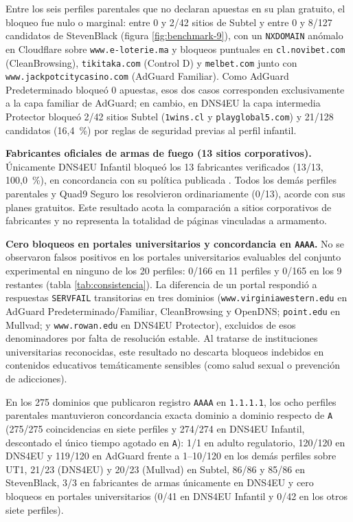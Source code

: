 \documentclass[10pt,a4paper]{article}
\begin{document}
Entre los seis perfiles parentales que no declaran apuestas en su plan gratuito, el bloqueo fue nulo o marginal: entre 0 y 2/42 sitios de Subtel y entre 0 y 8/127 candidatos de StevenBlack (figura \ref{fig:benchmark-9}), con un \texttt{NXDOMAIN} anómalo en Cloudflare sobre \texttt{www.e-loterie.ma} y bloqueos puntuales en \texttt{cl.novibet.com} (CleanBrowsing), \texttt{tikitaka.com} (Control D) y \texttt{melbet.com} junto con \texttt{www.jackpotcitycasino.com} (AdGuard Familiar). Como AdGuard Predeterminado bloqueó 0 apuestas, esos dos casos corresponden exclusivamente a la capa familiar de AdGuard; en cambio, en DNS4EU la capa intermedia Protector bloqueó 2/42 sitios Subtel (\texttt{1wins.cl} y \texttt{playglobal5.com}) y 21/128 candidatos (16,4~\%) por reglas de seguridad previas al perfil infantil.

\textbf{Fabricantes oficiales de armas de fuego (13 sitios corporativos).} Únicamente DNS4EU Infantil bloqueó los 13 fabricantes verificados (13/13, 100,0~\%), en concordancia con su política publicada \cite{dns4eupolitica}. Todos los demás perfiles parentales y Quad9 Seguro los resolvieron ordinariamente (0/13), acorde con sus planes gratuitos. Este resultado acota la comparación a sitios corporativos de fabricantes y no representa la totalidad de páginas vinculadas a armamento.

\textbf{Cero bloqueos en portales universitarios y concordancia en \texttt{AAAA}.} No se observaron falsos positivos en los portales universitarios evaluables del conjunto experimental en ninguno de los 20 perfiles: 0/166 en 11 perfiles y 0/165 en los 9 restantes (tabla \ref{tab:consistencia}). La diferencia de un portal respondió a respuestas \texttt{SERVFAIL} transitorias en tres dominios (\texttt{www.virginiawestern.edu} en AdGuard Predeterminado/Familiar, CleanBrowsing y OpenDNS; \texttt{point.edu} en Mullvad; y \texttt{www.rowan.edu} en DNS4EU Protector), excluidos de esos denominadores por falta de resolución estable. Al tratarse de instituciones universitarias reconocidas, este resultado no descarta bloqueos indebidos en contenidos educativos temáticamente sensibles (como salud sexual o prevención de adicciones).

En los 275 dominios que publicaron registro \texttt{AAAA} en \texttt{1.1.1.1}, los ocho perfiles parentales mantuvieron concordancia exacta dominio a dominio respecto de \texttt{A} (275/275 coincidencias en siete perfiles y 274/274 en DNS4EU Infantil, descontado el único tiempo agotado en \texttt{A}): 1/1 en adulto regulatorio, 120/120 en DNS4EU y 119/120 en AdGuard frente a 1--10/120 en los demás perfiles sobre UT1, 21/23 (DNS4EU) y 20/23 (Mullvad) en Subtel, 86/86 y 85/86 en StevenBlack, 3/3 en fabricantes de armas únicamente en DNS4EU y cero bloqueos en portales universitarios (0/41 en DNS4EU Infantil y 0/42 en los otros siete perfiles).
\end{document}
